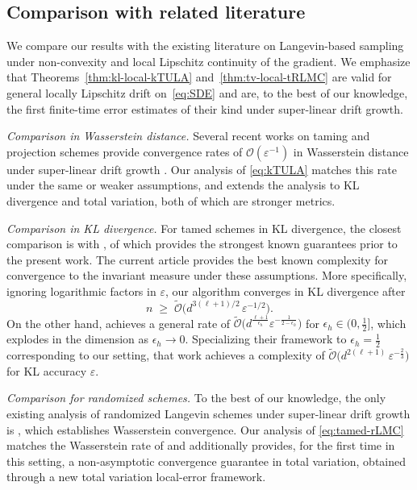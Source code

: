 \documentclass[11pt,a4paper,reqno]{amsart}
\theoremstyle{plain}
\theoremstyle{definition}
\theoremstyle{remark}
\begin{document}
\subsection{Comparison with related literature}
\label{subsec:related-work}

We compare our results with the existing literature on Langevin-based sampling under non-convexity and local Lipschitz continuity of the gradient. We emphasize that Theorems~\ref{thm:kl-local-kTULA} and~\ref{thm:tv-local-tRLMC} are valid for general locally Lipschitz drift on~\eqref{eq:SDE} and are, to the best of our knowledge, the first finite-time error estimates of their kind under super-linear drift growth.

\medskip
\noindent\emph{Comparison in Wasserstein distance.}
Several recent works on taming and projection schemes provide convergence rates of $\mathcal{O}(\varepsilon^{-1})$ in Wasserstein distance under super-linear drift growth \cite{yang2025non,bao2024geometric}. Our analysis of \eqref{eq:kTULA} matches this rate under the same or weaker assumptions, and extends the analysis to KL divergence and total variation, both of which are stronger metrics.

\medskip
\noindent\emph{Comparison in KL divergence.}
For tamed schemes in KL divergence, the closest comparison is with \cite{lytras2024tamed,lytras2025taming,lytras2025ktula}, of which \cite{lytras2025ktula} provides the strongest known guarantees prior to the present work. The current article provides the best known complexity for convergence to the invariant measure under these assumptions. More specifically, ignoring logarithmic factors in $\varepsilon$, our algorithm converges in KL divergence after
\[
 n \;\ge\; \widetilde{\mathcal{O}}\!\bigl(d^{3(\ell+1)/2}\,\varepsilon^{-1/2}\bigr).
\]
On the other hand, \cite{lytras2025ktula} achieves a general rate of $\widetilde{\mathcal{O}}\!\bigl(d^{\frac{\ell+1}{\epsilon_h}} \varepsilon^{-\frac{1}{2-\epsilon_h}}\bigr)$ for $\epsilon_h \in \bigl(0,\frac{1}{2}\bigr]$, which explodes in the dimension as $\epsilon_h \to 0$. Specializing their framework to $\epsilon_h=\frac{1}{2}$ corresponding to our setting, that work achieves a complexity of $\widetilde{\mathcal{O}}\!\bigl(d^{2(\ell+1)}\,\varepsilon^{-\frac{2}{3}}\bigr)$ for KL accuracy $\varepsilon$.

\medskip
\noindent\emph{Comparison for randomized schemes.}
To the best of our knowledge, the only existing analysis of randomized Langevin schemes under super-linear drift growth is \cite{wang2025langevin}, which establishes Wasserstein convergence. Our analysis of \eqref{eq:tamed-rLMC} matches the Wasserstein rate of \cite{wang2025langevin} and additionally provides, for the first time in this setting, a non-asymptotic convergence guarantee in total variation, obtained through a new total variation local-error framework.
\end{document}
